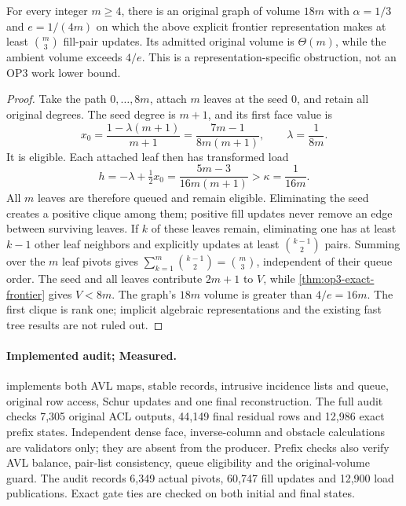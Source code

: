 \begin{proposition}
\label{prop:op3-explicit-frontier-cubic}
For every integer $m\geq4$, there is an original graph of volume $18m$
with $\alpha=1/3$ and $e=1/(4m)$ on which the above explicit frontier
representation makes at least $\binom m3$ fill-pair updates. Its admitted
original volume is $\Theta(m)$, while the ambient volume exceeds $4/e$.
This is a representation-specific obstruction, not an OP3 work lower bound.
\end{proposition}
\begin{proof}
Take the path $0,\ldots,8m$, attach $m$ leaves at the seed $0$, and retain
all original degrees. The seed degree is $m+1$, and its first face value is
\[
 x_0=\frac{1-\lambda(m+1)}{m+1}
 =\frac{7m-1}{8m(m+1)},\qquad \lambda=\frac1{8m}.
\]
It is eligible. Each attached leaf then has transformed load
\[
 h=-\lambda+\tfrac12x_0
 =\frac{5m-3}{16m(m+1)}>
 \kappa=\frac1{16m}.
\]
All $m$ leaves are therefore queued and remain eligible. Eliminating the
seed creates a positive clique among them; positive fill updates never
remove an edge between surviving leaves. If $k$ of these leaves remain,
eliminating one has at least $k-1$ other leaf neighbors and explicitly
updates at least $\binom{k-1}{2}$ pairs. Summing over the $m$ leaf pivots
gives $\sum_{k=1}^m\binom{k-1}{2}=\binom m3$, independent of their
queue order. The seed and all leaves contribute $2m+1$ to $V$, while
\cref{thm:op3-exact-frontier} gives $V<8m$. The graph's $18m$ volume is
greater than $4/e=16m$. The first clique is rank one; implicit algebraic
representations and the existing fast tree results are not ruled out.
\end{proof}

\paragraph{Implemented audit; Measured.}
 implements both AVL maps, stable records,
intrusive incidence lists and queue, original row access, Schur updates and
one final reconstruction. The full audit checks 7,305 original ACL outputs,
44,149 final residual rows and 12,986 exact prefix states. Independent
dense face, inverse-column and obstacle calculations are validators only;
they are absent from the producer. Prefix checks also verify AVL balance,
pair-list consistency, queue eligibility and the original-volume guard.
The audit records 6,349 actual pivots, 60,747 fill updates and 12,900 load
publications. Exact gate ties are checked on both initial and final states.

